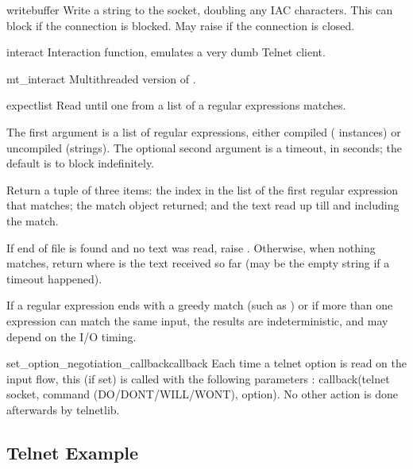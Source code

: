 \begin{methoddesc}[Telnet]{write}{buffer}
Write a string to the socket, doubling any IAC characters.
This can block if the connection is blocked.  May raise
 if the connection is closed.
\end{methoddesc}

\begin{methoddesc}[Telnet]{interact}{}
Interaction function, emulates a very dumb Telnet client.
\end{methoddesc}

\begin{methoddesc}[Telnet]{mt_interact}{}
Multithreaded version of .
\end{methoddesc}

\begin{methoddesc}[Telnet]{expect}{list}
Read until one from a list of a regular expressions matches.

The first argument is a list of regular expressions, either
compiled ( instances) or uncompiled (strings).
The optional second argument is a timeout, in seconds; the default
is to block indefinitely.

Return a tuple of three items: the index in the list of the
first regular expression that matches; the match object
returned; and the text read up till and including the match.

If end of file is found and no text was read, raise
.  Otherwise, when nothing matches, return
 where  is the text received so
far (may be the empty string if a timeout happened).

If a regular expression ends with a greedy match (such as )
or if more than one expression can match the same input, the
results are indeterministic, and may depend on the I/O timing.
\end{methoddesc}

\begin{methoddesc}[Telnet]{set_option_negotiation_callback}{callback}
Each time a telnet option is read on the input flow, this
 (if set) is called with the following parameters :
callback(telnet socket, command (DO/DONT/WILL/WONT), option).  No other
action is done afterwards by telnetlib.
\end{methoddesc}


\subsection{Telnet Example \label{telnet-example}}

